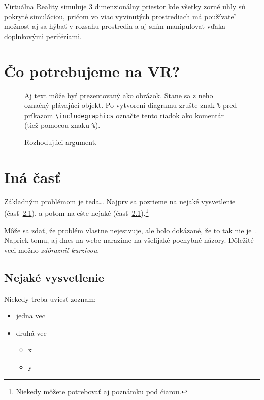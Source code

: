 \documentclass[10pt,twoside,slovak,a4paper]{article}
\begin{document}
Virtuálna Reality simuluje 3 dimenzionálny priestor kde všetky zorné uhly sú pokryté simuláciou, pričom vo viac vyvinutých prostrediach má používateľ možnosť aj sa hýbať v rozsahu prostredia a aj sním manipulovať vďaka doplnkovými perifériami.

\section{Čo potrebujeme na VR?} \label{Devices}

\begin{figure*}[tbh]
\centering
Aj text môže byť prezentovaný ako obrázok. Stane sa z neho označný plávajúci objekt. Po vytvorení diagramu zrušte znak \texttt{\%} pred príkazom \verb|\includegraphics| označte tento riadok ako komentár (tiež pomocou znaku \texttt{\%}).
\caption{Rozhodujúci argument.}
\label{f:rozhod}
\end{figure*}



\section{Iná časť} \label{ina}

Základným problémom je teda\ldots{} Najprv sa pozrieme na nejaké vysvetlenie (časť~\ref{ina:nejake}), a potom na ešte nejaké (časť~\ref{ina:nejake}).\footnote{Niekedy môžete potrebovať aj poznámku pod čiarou.}

Môže sa zdať, že problém vlastne nejestvuje\cite{Coplien:MPD}, ale bolo dokázané, že to tak nie je~\cite{Czarnecki:Staged, Czarnecki:Progress}. Napriek tomu, aj dnes na webe narazíme na všelijaké pochybné názory\cite{PLP-Framework}. Dôležité veci možno \emph{zdôrazniť kurzívou}.


\subsection{Nejaké vysvetlenie} \label{ina:nejake}

Niekedy treba uviesť zoznam:

\begin{itemize}
\item jedna vec
\item druhá vec
	\begin{itemize}
	\item x
	\item y
	\end{itemize}
\end{itemize}
\end{document}
